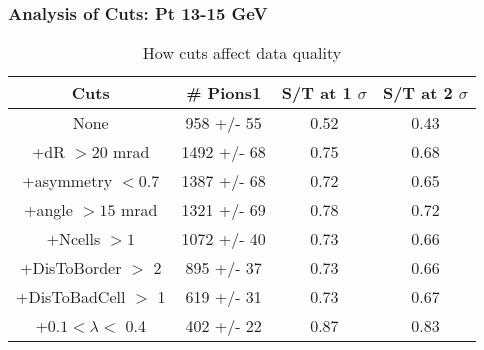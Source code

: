 \frame
{
\frametitle{Analysis of Cuts: Pt 13-15 GeV}
\begin{table}
\caption{How cuts affect data quality}
\centering
\begin{tabular}{c c c c}
\hline\hline
Cuts & \# Pions1 & S/T at 1 $\sigma$ & S/T at 2 $\sigma$ \\ [0.5ex]
\hline
None &  958 +/-   55 & 0.52 & 0.43 \\ %
+dR $> 20$ mrad & 1492 +/-   68 & 0.75 & 0.68 \\ %
+asymmetry $< 0.7$ & 1387 +/-   68 & 0.72 & 0.65 \\ %
+angle $> 15$ mrad & 1321 +/-   69 & 0.78 & 0.72 \\ %
+Ncells $> 1$& 1072 +/-   40 & 0.73 & 0.66 \\ %
+DisToBorder $>$ 2 &  895 +/-   37 & 0.73 & 0.66 \\ %
+DisToBadCell $>$ 1&  619 +/-   31 & 0.73 & 0.67 \\ %
+$0.1 < \lambda <$ 0.4 &  402 +/-   22 & 0.87 & 0.83 \\ %
[1ex]
\hline
\end{tabular}
\label{table:nonlin}
\end{table}
}
